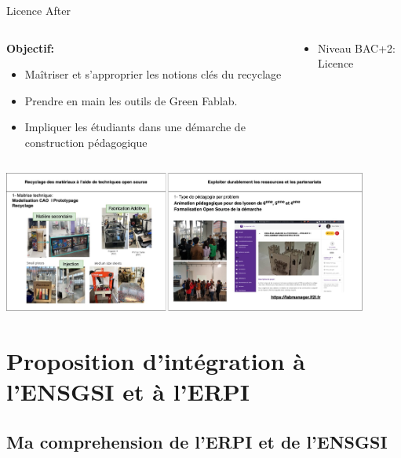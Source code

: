 \documentclass[
  11pt,
  ignorenonframetext,
  aspectratio=169,
  c]{beamer}
\providecommand{\tightlist}{%
  \setlength{\itemsep}{0pt}\setlength{\parskip}{0pt}}\usepackage{longtable,booktabs,array}
\begin{document}
\begin{frame}{Licence After}
\protect\hypertarget{licence-after}{}
\begin{columns}[T]
\begin{column}[c]{0.6\textwidth}
\scriptsize

\textbf{Objectif:}

\begin{itemize}
\tightlist
\item
  Maîtriser et s'approprier les notions clés du recyclage
\item
  Prendre en main les outils de Green Fablab.
\item
  Impliquer les étudiants dans une démarche de construction pédagogique
\end{itemize}
\end{column}

\begin{column}[c]{0.4\textwidth}
\scriptsize

\begin{itemize}
\tightlist
\item
  Niveau BAC+2: Licence
\end{itemize}
\end{column}
\end{columns}

\includegraphics[width=0.9\textwidth,height=\textheight]{figures/slides/Ensegnement-AFTER.jpg}
\end{frame}

\hypertarget{proposition-dintuxe9gration-uxe0-lensgsi-et-uxe0-lerpi}{%
\section{Proposition d'intégration à l'ENSGSI et à
l'ERPI}\label{proposition-dintuxe9gration-uxe0-lensgsi-et-uxe0-lerpi}}

\hypertarget{ma-comprehension-de-lerpi-et-de-lensgsi}{%
\subsection{Ma comprehension de l'ERPI et de
l'ENSGSI}\label{ma-comprehension-de-lerpi-et-de-lensgsi}}
\end{document}
